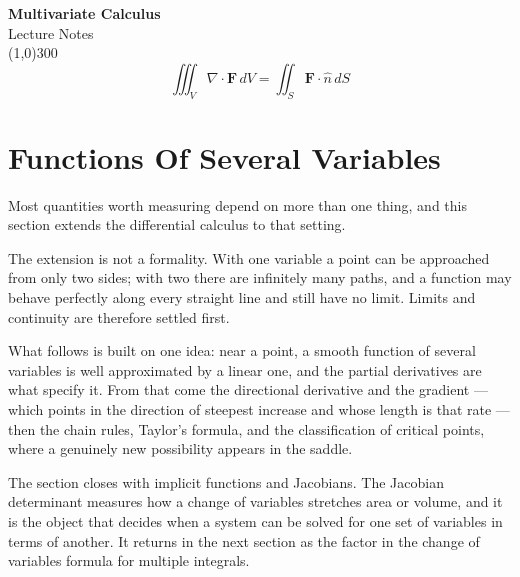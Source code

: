 \documentclass[11pt,a4paper]{article}
\theoremstyle{definition}
\begin{document}
\begin{titlepage}
\begin{center}
\vspace*{3cm}
{\Huge\bfseries Multivariate Calculus}\\[1.2cm]
{\large Lecture Notes}\\[2.5cm]
\line(1,0){300}\\[1.5cm]
\[\iiint_V \nabla\cdot\mathbf{F}\,dV = \iint_S \mathbf{F}\cdot\widehat{n}\,dS\]
\end{center}
\end{titlepage}

\tableofcontents
\thispagestyle{empty}
\clearpage
\setcounter{page}{1}

{\color[wave]{485}\section{Functions Of Several Variables}}

Most quantities worth measuring depend on more than one thing, and this section
extends the differential calculus to that setting.

The extension is not a formality. With one variable a point can be approached
from only two sides; with two there are infinitely many paths, and a function
may behave perfectly along every straight line and still have no limit. Limits
and continuity are therefore settled first.

What follows is built on one idea: near a point, a smooth function of several
variables is well approximated by a linear one, and the partial derivatives are
what specify it. From that come the directional derivative and the gradient ---
which points in the direction of steepest increase and whose length is that rate
--- then the chain rules, Taylor's formula, and the classification of critical
points, where a genuinely new possibility appears in the saddle.

The section closes with implicit functions and Jacobians. The Jacobian
determinant measures how a change of variables stretches area or volume, and it
is the object that decides when a system can be solved for one set of variables
in terms of another. It returns in the next section as the factor in the change
of variables formula for multiple integrals.
\end{document}
